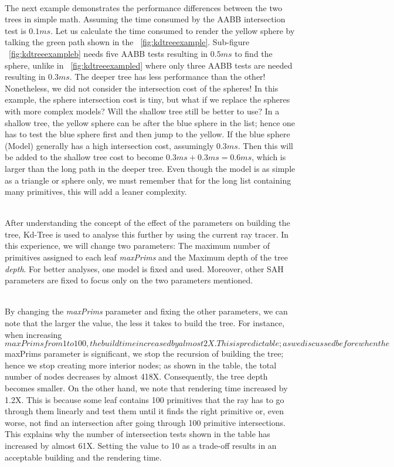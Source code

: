 \documentclass[11pt,a4paper]{article}
\begin{document}
\noindent
\\
The next example demonstrates the performance differences between the two trees in simple math. Assuming the time consumed by the AABB intersection test is $0.1ms$. Let us calculate the time consumed to render the yellow sphere by talking the green path shown in the ~\ref{fig:kdtreeexample}. Sub-figure ~\ref{fig:kdtreeexampleb}
 needs five AABB tests resulting in $0.5ms$ to find the sphere, unlike in ~\ref{fig:kdtreeexampled}
 where only three AABB tests are needed resulting in $0.3ms$. The deeper tree has less performance than the other! Nonetheless, we did not consider the intersection cost of the spheres! In this example, the sphere intersection cost is tiny, but what if we replace the spheres with more complex models? Will the shallow tree still be better to use? In a shallow tree, the yellow sphere can be after the blue sphere in the list; hence one has to test the blue sphere first and then jump to the yellow. If the blue sphere (Model) generally has a high intersection cost, assumingly $0.3ms$. Then this will be added to the shallow tree cost to become $0.3ms + 0.3ms = 0.6ms$, which is larger than the long path in the deeper tree. Even though the model is as simple as a triangle or sphere only, we must remember that for the long list containing many primitives, this will add a leaner complexity.

\noindent
\\
After understanding the concept of the effect of the parameters on building the tree, Kd-Tree is used to analyse this further by using the current ray tracer. In this experience, we will change two parameters: The maximum number of primitives assigned to each leaf \textit{maxPrims} and the Maximum depth of the tree \textit{depth}. For better analyses, one model is fixed and used. Moreover, other SAH parameters are fixed to focus only on the two parameters mentioned. 

\noindent
\\
By changing the \textit{maxPrims} parameter and fixing the other parameters, we can note that the larger the value, the less it takes to build the tree. For instance, when increasing ${maxPrims} from  1 to 100, the build time increased by almost 2X. This is predictable; as we discussed before when the ${maxPrims} parameter is significant, we stop the recursion of building the tree; hence we stop creating more interior nodes; as shown in the table, the total number of nodes decreases by almost 418X. Consequently, the tree depth becomes smaller. On the other hand, we note that rendering time increased by 1.2X. This is because some leaf contains 100 primitives that the ray has to go through them linearly and test them until it finds the right primitive or, even worse, not find an intersection after going through 100 primitive intersections. This explains why the number of intersection tests shown in the table has increased by almost  61X. Setting the value to 10 as a trade-off results in an acceptable building and the rendering time.
\end{document}
